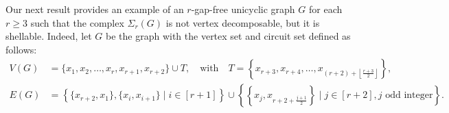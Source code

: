 \documentclass[12pt,reqno]{amsart}
\theoremstyle{definition}
\begin{document}
    Our next result provides an example of an $r$-gap-free unicyclic graph $G$ for each $r\ge 3$ such that the complex $\Sigma_r(G)$ is not vertex decomposable, but it is shellable. Indeed, let $G$ be the graph with the vertex set and circuit set defined as follows: 
\begin{equation}\label{eq3146}
	\begin{split}
		V(G) &= \{x_1, x_2, \ldots, x_r, x_{r+1}, x_{r+2}\} \cup T, \quad \text{with} \quad T = \left\{ x_{r+3}, x_{r+4}, \ldots,  x_{(r+2)+\left\lfloor \tfrac{r+3}{2} \right\rfloor} \right\}, \\
		E(G) &= \left\{\{x_{r+2}, x_1\}, \{x_i, x_{i+1}\} \mid i \in [r+1] \right\}\cup \left\{ \left\{x_j, x_{r+2 + \tfrac{j+1}{2}} \right\} \mid j \in [r+2], j\text{ odd integer} \right\}.
		\end{split}
\end{equation}
\end{document}

